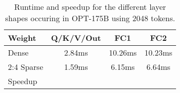 \documentclass{article}
\theoremstyle{plain}
\theoremstyle{definition}
\theoremstyle{remark}
\begin{document}
\begin{table}[h!]
    \centering
    \begin{tabular}{|l|c|c|c|}
        \toprule
        Weight & Q/K/V/Out & FC1 & FC2 \\
        \midrule
        Dense & 2.84ms & 10.26ms & 10.23ms \\
        2:4 Sparse & 1.59ms & 6.15ms &6.64ms \\
        \midrule
        Speedup &  &  &  \\
        \bottomrule
    \end{tabular}
    \caption{Runtime and speedup for the different layer shapes occuring in OPT-175B using 2048 tokens.}
    \label{tab:gpu-speedups}
\end{table}
\end{document}
